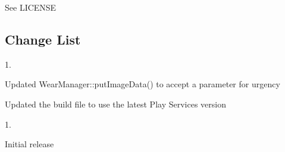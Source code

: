 See L\+I\+C\+E\+N\+SE

\subsection*{Change List}

1.
\begin{DoxyItemize}
\item Updated Wear\+Manager\+::put\+Image\+Data() to accept a parameter for urgency
\item Updated the build file to use the latest Play Services version
\end{DoxyItemize}

1.
\begin{DoxyItemize}
\item Initial release 
\end{DoxyItemize}